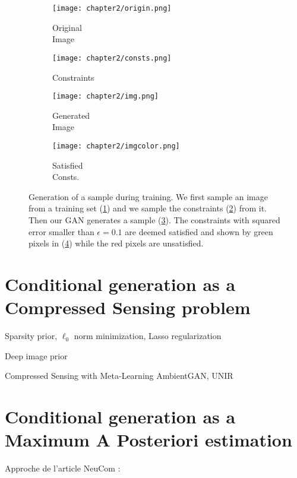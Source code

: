 \begin{figure}[t]
\centering
\begin{subfigure}[t]{0.25\textwidth}
	\centering
	\texttt{[image: chapter2/origin.png]}
	\caption{Original\\Image}
	\label{fig:original_shoe}
\end{subfigure}\begin{subfigure}[t]{0.25\textwidth}
	\centering
	\texttt{[image: chapter2/consts.png]}
	\caption{Constraints}
	\label{fig:constraints}
\end{subfigure}\begin{subfigure}[t]{0.25\textwidth}
	\centering
	\texttt{[image: chapter2/img.png]}
	\caption{Generated\\Image}
	\label{fig:pixelwise}
\end{subfigure}\begin{subfigure}[t]{0.24\textwidth}
	\centering
	\texttt{[image: chapter2/imgcolor.png]}
	\caption{Satisfied\\Consts.}
	\label{fig:generated}
\end{subfigure}
\caption[Generation of a sample during training]{Generation of a sample during training. We first sample an image from a training set (\ref{fig:original_shoe}) and we sample the constraints (\ref{fig:constraints}) from it. Then our GAN generates a sample (\ref{fig:pixelwise}). The constraints with squared error smaller than $\epsilon=0.1$ are deemed satisfied and shown by green pixels in (\ref{fig:generated}) while the red pixels are unsatisfied.}
\label{fig:image_completion}
\end{figure}



\section{Conditional generation as a Compressed Sensing problem}

Sparsity prior, $\ell_0$ norm minimization, Lasso regularization

Deep image prior


 Compressed Sensing with Meta-Learning
 AmbientGAN, UNIR
 
\section{Conditional generation as a Maximum A  Posteriori estimation}
Approche de l'article NeuCom :

